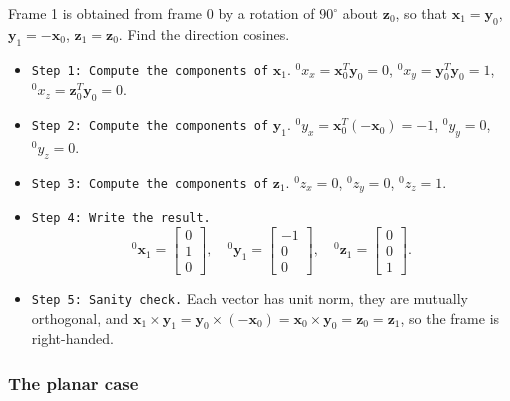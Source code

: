 \begin{example}
Frame 1 is obtained from frame 0 by a rotation of $90^\circ$ about $\mathbf{z}_0$, so that $\mathbf{x}_1=\mathbf{y}_0$, $\mathbf{y}_1=-\mathbf{x}_0$, $\mathbf{z}_1=\mathbf{z}_0$. Find the direction cosines.
\begin{itemize}
    \item \texttt{Step 1: Compute the components of} $\mathbf{x}_1$. ${}^0x_x=\mathbf{x}_0^T\mathbf{y}_0=0$, \; ${}^0x_y=\mathbf{y}_0^T\mathbf{y}_0=1$, \; ${}^0x_z=\mathbf{z}_0^T\mathbf{y}_0=0$.
    \vspace{0.2cm}
    \item \texttt{Step 2: Compute the components of} $\mathbf{y}_1$. ${}^0y_x=\mathbf{x}_0^T(-\mathbf{x}_0)=-1$, \; ${}^0y_y=0$, \; ${}^0y_z=0$.
    \vspace{0.2cm}
    \item \texttt{Step 3: Compute the components of} $\mathbf{z}_1$. ${}^0z_x=0$, \; ${}^0z_y=0$, \; ${}^0z_z=1$.
    \vspace{0.2cm}
    \item \texttt{Step 4: Write the result.} 
    \[
    {}^0\mathbf{x}_1=\begin{bmatrix}0\\1\\0\end{bmatrix},\quad
    {}^0\mathbf{y}_1=\begin{bmatrix}-1\\0\\0\end{bmatrix},\quad
    {}^0\mathbf{z}_1=\begin{bmatrix}0\\0\\1\end{bmatrix}.
    \]
    \vspace{0.2cm}
    \item \texttt{Step 5: Sanity check.} Each vector has unit norm, they are mutually orthogonal, and $\mathbf{x}_1\times\mathbf{y}_1=\mathbf{y}_0\times(-\mathbf{x}_0)=\mathbf{x}_0\times\mathbf{y}_0=\mathbf{z}_0=\mathbf{z}_1$, so the frame is right-handed.
\end{itemize}
\end{example}

\subsubsection{The planar case}

